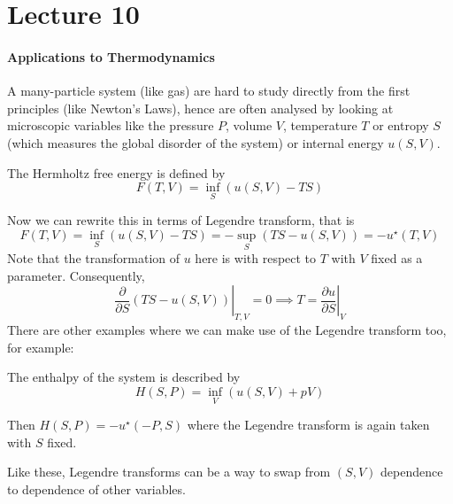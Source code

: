 \documentclass[a4paper]{article}
\begin{document}
\part*{Lecture 10}
\subsection{Applications to Thermodynamics}
A many-particle system (like gas) are hard to study directly from the first principles (like Newton's Laws), hence are often analysed by looking at microscopic variables like the pressure $P$, volume $V$, temperature $T$ or entropy $S$ (which measures the global disorder of the system) or internal energy $u(S,V)$.
\begin{definition}
    The Hermholtz free energy is defined by
    $$F(T,V)=\inf_{S}(u(S,V)-TS)$$
\end{definition}
Now we can rewrite this in terms of Legendre transform, that is
$$F(T,V)=\inf_{S}(u(S,V)-TS)=-\sup_{S}(TS-u(S,V))=-u^\star(T,V)$$
Note that the transformation of $u$ here is with respect to $T$ with $V$ fixed as a parameter.
Consequently,
$$\left.\frac{\partial}{\partial S}(TS-u(S,V))\right|_{T,V}=0\implies T=\left.\frac{\partial u}{\partial S}\right|_V$$
There are other examples where we can make use of the Legendre transform too, for example:
\begin{definition}
    The enthalpy of the system is described by
    $$H(S,P)=\inf_{V}(u(S,V)+pV)$$
\end{definition}
Then $H(S,P)=-u^\star(-P,S)$ where the Legendre transform is again taken with $S$ fixed.

Like these, Legendre transforms can be a way to swap from $(S,V)$ dependence to dependence of other variables.
\end{document}
